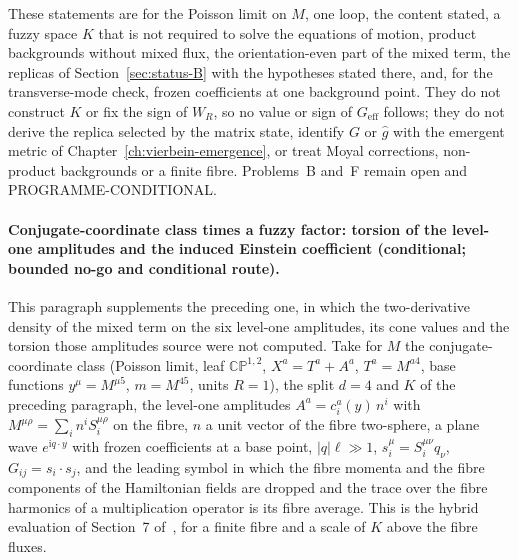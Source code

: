 These statements are for the Poisson limit on \(M\), one loop, the content stated, a fuzzy space \(K\) that is not required to solve the equations of motion, product backgrounds without mixed flux, the orientation-even part of the mixed term, the replicas of Section~\ref{sec:status-B} with the hypotheses stated there, and, for the transverse-mode check, frozen coefficients at one background point. They do not construct \(K\) or fix the sign of \(W_R\), so no value or sign of \(G_{\mathrm{eff}}\) follows; they do not derive the replica selected by the matrix state, identify \(G\) or \(\hat g\) with the emergent metric of Chapter~\ref{ch:vierbein-emergence}, or treat Moyal corrections, non-product backgrounds or a finite fibre. Problems~B and~F remain open and PROGRAMME-CONDITIONAL.

\paragraph{Conjugate-coordinate class times a fuzzy factor: torsion of the level-one amplitudes and the induced Einstein coefficient (conditional; bounded no-go and conditional route).}
This paragraph supplements the preceding one, in which the two-derivative density of the mixed term on the six level-one amplitudes, its cone values and the torsion those amplitudes source were not computed. Take for \(M\) the conjugate-coordinate class (Poisson limit, leaf \(\mathbb{CP}^{1,2}\), \(X^a=T^a+A^a\), \(T^a=M^{a4}\), base functions \(y^\mu=M^{\mu5}\), \(m=M^{45}\), units \(R=1\)), the split \(d=4\) and \(K\) of the preceding paragraph, the level-one amplitudes \(A^a=c_i^a(y)\,n^i\) with \(M^{\mu\rho}=\sum_in^iS_i^{\mu\rho}\) on the fibre, \(n\) a unit vector of the fibre two-sphere, a plane wave \(e^{\mathrm iq\cdot y}\) with frozen coefficients at a base point, \(|q|\ell\gg1\), \(s_i^\mu=S_i^{\mu\nu}q_\nu\), \(G_{ij}=s_i\cdot s_j\), and the leading symbol in which the fibre momenta and the fibre components of the Hamiltonian fields are dropped and the trace over the fibre harmonics of a multiplication operator is its fibre average. This is the hybrid evaluation of Section~7 of~\cite{Steinacker2023}, for a finite fibre and a scale of \(K\) above the fibre fluxes.

